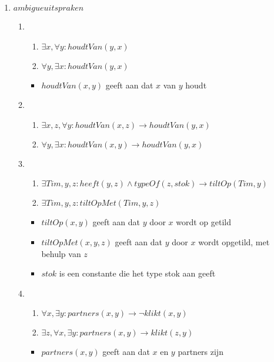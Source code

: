 \documentclass[]{article}
\begin{document}
\begin{enumerate}[a]
    \item $ ambigue uitspraken $
    \begin{enumerate}[i]
      \item
      \begin{enumerate}[1]
        \item $\exists x, \forall y: houdtVan(y,x)$
        \item $\forall y, \exists x: houdtVan(y,x)$
      \end{enumerate}
      \begin{itemize}
        \item $houdtVan(x,y)$ geeft aan dat $x$ van $y$ houdt
      \end{itemize}
      \item
      \begin{enumerate}[1]
        \item $\exists x,z, \forall y: houdtVan(x,z) \longrightarrow houdtVan(y,x)$
        \item $\forall y, \exists x: houdtVan(x,y) \longrightarrow houdtVan(y,x)$
      \end{enumerate}
      \item
      \begin{enumerate}[1]
        \item $\exists Tim, y, z: heeft(y,z)\land typeOf(z,stok) \longrightarrow tiltOp(Tim,y) $
        \item $\exists Tim, y, z: tiltOpMet(Tim,y,z) $
      \end{enumerate}
      \begin{itemize}
        \item $tiltOp(x,y)$ geeft aan dat $y$ door $x$ wordt op getild
        \item $tiltOpMet(x,y,z)$ geeft aan dat $y$ door $x$ wordt opgetild, met behulp van $z$
        \item $stok$ is een constante die het type stok aan geeft
      \end{itemize}
      \item %
      \begin{enumerate}[1]
        \item $\forall x, \exists y : partners(x,y) \longrightarrow \neg klikt(x,y)$
        \item $\exists z, \forall x, \exists y: partners(x,y) \longrightarrow klikt(z,y) $
      \end{enumerate}
      \begin{itemize}
        \item $partners(x,y)$ geeft aan dat $x$ en $y$ partners zijn

\end{itemize}
\end{enumerate}
\end{enumerate}
\end{document}
